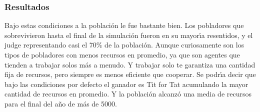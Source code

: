\documentclass{article}
\begin{document}
\subsubsection{Resultados}
Bajo estas condiciones a la poblaci\'on le fue bastante bien. Los pobladores que sobrevivieron hasta el final de la simulación fueron en su mayor\'{\i}a resentidos, y el judge representando
casi el 70\% de la poblaci\'on. Aunque curiosamente son los tipos de pobladores con menos recursos en promedio, ya que son agentes que tienden a trabajar solos m\'as a menudo. Y trabajar solo
te garantiza una cantidad fija de recursos, pero siempre es menos eficiente que cooperar. Se podr\'{\i}a decir que bajo las condiciones por defecto el ganador es Tit for Tat acumulando la mayor
cantidad de recursos en promedio. Y la poblaci\'on alcanz\'o una media de recursos para el final del a\~no de m\'as de 5000.
\end{document}
